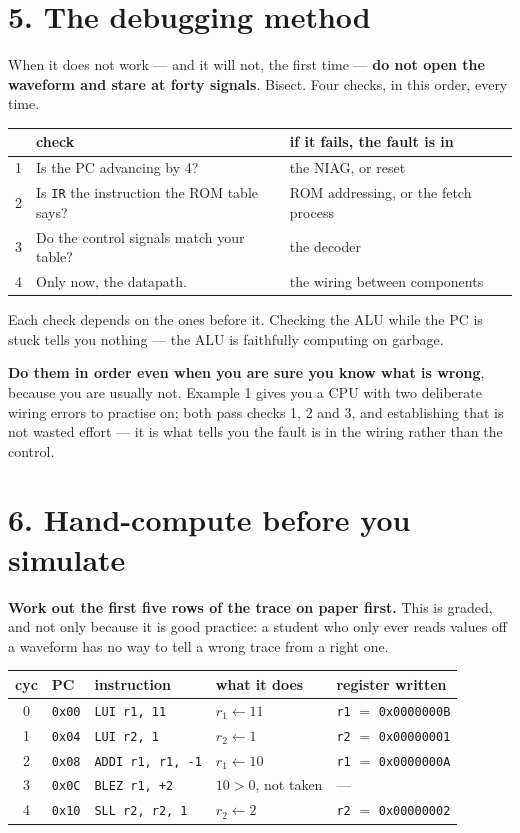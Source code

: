 \documentclass[11pt]{article}
\newcommand{\code}[1]{\texttt{#1}}
\begin{document}
\section*{5. The debugging method}

When it does not work --- and it will not, the first time --- \textbf{do not
open the waveform and stare at forty signals}. Bisect. Four checks, in this
order, every time.

\begin{center}
\begin{tabular}{cll}
\toprule
& check & if it fails, the fault is in \\
\midrule
1 & Is the PC advancing by 4? & the NIAG, or reset \\
2 & Is \code{IR} the instruction the ROM table says? & ROM addressing, or the fetch process \\
3 & Do the control signals match your table? & the decoder \\
4 & Only now, the datapath. & the wiring between components \\
\bottomrule
\end{tabular}
\end{center}

Each check depends on the ones before it. Checking the ALU while the PC is stuck
tells you nothing --- the ALU is faithfully computing on garbage.

\textbf{Do them in order even when you are sure you know what is wrong}, because
you are usually not. Example 1 gives you a CPU with two deliberate wiring errors
to practise on; both pass checks 1, 2 and 3, and establishing that is not wasted
effort --- it is what tells you the fault is in the wiring rather than the
control.

\section*{6. Hand-compute before you simulate}

\textbf{Work out the first five rows of the trace on paper first.} This is
graded, and not only because it is good practice: a student who only ever reads
values off a waveform has no way to tell a wrong trace from a right one.

\begin{center}
\begin{tabular}{cllll}
\toprule
cyc & PC & instruction & what it does & register written \\
\midrule
0 & \code{0x00} & \code{LUI r1, 11} & $r_1 \leftarrow 11$ & \code{r1} $=$ \code{0x0000000B} \\
1 & \code{0x04} & \code{LUI r2, 1} & $r_2 \leftarrow 1$ & \code{r2} $=$ \code{0x00000001} \\
2 & \code{0x08} & \code{ADDI r1, r1, -1} & $r_1 \leftarrow 10$ & \code{r1} $=$ \code{0x0000000A} \\
3 & \code{0x0C} & \code{BLEZ r1, +2} & $10 > 0$, not taken & --- \\
4 & \code{0x10} & \code{SLL r2, r2, 1} & $r_2 \leftarrow 2$ & \code{r2} $=$ \code{0x00000002} \\
\bottomrule
\end{tabular}
\end{center}
\end{document}
